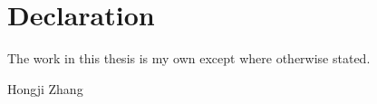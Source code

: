 
\chapter*{Declaration}\label{declaration}
\thispagestyle{empty}
The work in this thesis is my own except where otherwise stated.

\vspace{1in}


\hfill\hfill\hfill
%
Hongji Zhang
%
\hspace*{\fill}
